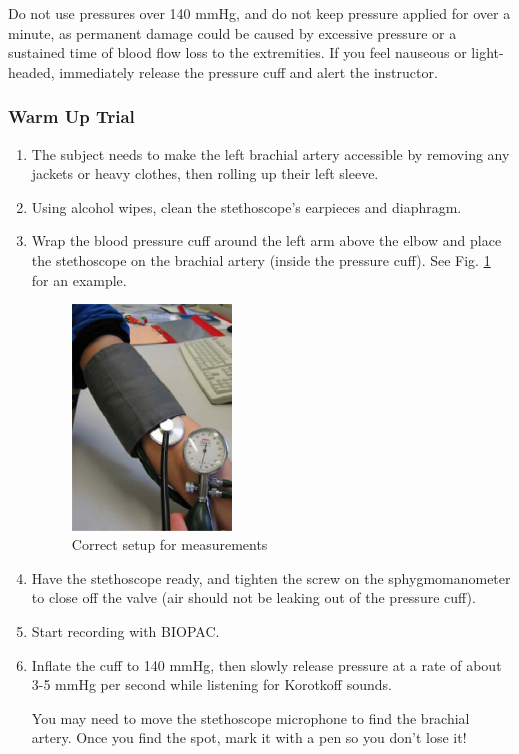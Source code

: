 \documentclass{article}
\begin{document}
\begin{warn}
	Do not use pressures over 140 mmHg, and do not keep pressure applied for over a minute, as permanent damage could be caused by excessive pressure or a sustained time of blood flow loss to the extremities. If you feel nauseous or light-headed, immediately release the pressure cuff and alert the instructor.
\end{warn}

\subsubsection*{Warm Up Trial}
\begin{enumerate}
	\item The subject needs to make the left brachial artery accessible by removing any jackets or heavy clothes, then rolling up their left sleeve.
	\item Using alcohol wipes, clean the stethoscope's earpieces and diaphragm.
	\item Wrap the blood pressure cuff around the left arm above the elbow and place the stethoscope on the brachial artery (inside the pressure cuff). See Fig. \ref{setup_2} for an example.
		\begin{figure}[h]
		\centering\includegraphics[width=0.4\textwidth]{../images/BP_6.jpg}
		\caption{Correct setup for measurements}
		\label{setup_2}
		\end{figure}
		
	\item Have the stethoscope ready, and tighten the screw on the sphygmomanometer to close off the valve (air should not be leaking out of the pressure cuff).
	\item Start recording with BIOPAC.
	\item Inflate the cuff to 140 mmHg, then slowly release pressure at a rate of about 3-5 mmHg per second while listening for Korotkoff sounds.
	\begin{info}
		You may need to move the stethoscope microphone to find the brachial artery. Once you find the spot, mark it with a pen so you don't lose it!
	\end{info}
	

\end{enumerate}
\end{document}
